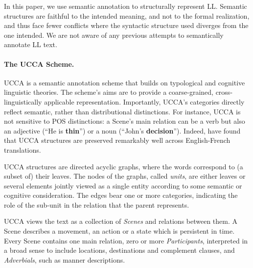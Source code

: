 \documentclass[a4paper, 11pt]{article}
\newcommand{\com}[1]{}
\begin{document}
In this paper, we use semantic annotation to structurally
represent LL. Semantic structures are faithful to the intended
meaning, and not to the formal realization, and thus face
fewer conflicts where the syntactic structure used diverges from
the one intended. We are not aware of any previous attempts to semantically
annotate LL text.


\paragraph{The UCCA Scheme.}\label{sec:ucca}
UCCA is a semantic annotation scheme that builds on
typological and cognitive linguistic theories.
The scheme's aims are to provide a coarse-grained, cross-linguistically
applicable representation.
Importantly, UCCA's categories directly reflect semantic, rather than
distributional distinctions.
For instance, UCCA is not sensitive to POS distinctions:
a Scene's main relation can be a verb but also an adjective
(``He is {\bf thin}'') or a noun (``John's {\bf decision}'').
Indeed,  have found that UCCA structures are
preserved remarkably well across English-French translations. 

UCCA structures are directed acyclic graphs, where the words
correspond to (a subset of) their leaves.
The nodes of the graphs, called {\it units}, are either leaves or several elements jointly
viewed as a single entity according to some semantic or cognitive consideration.
The edges bear one or more categories, indicating the role of 
the sub-unit in the relation that the parent represents.

UCCA views the text as a collection of {\it Scenes} and relations between them.
A Scene describes a movement, 
an action or a state which is persistent in time.
Every Scene contains one main relation, 
zero or more {\it Participants}, 
interpreted in a broad sense to include locations, destinations and complement clauses,
and {\it Adverbials}, such as manner descriptions.

\com{
\begin{figure}[t]
				\begin{tikzpicture}[sibling distance=10mm, level distance=10mm, ->,
				every node/.append style={midway},
				every circle node/.append style={fill=black}]
				{
					\node (Source) [circle] {}
					child {node (He) {He} edge from parent node[left] {\scriptsize A}
					}
					child {node (gave) {gve} edge from parent node[right] {\scriptsize A}}
					child {node (an apple) [circle] {}
						{
							child {node (an) {an} edge from parent node[left] {\scriptsize E}}
							child {node (apple){apple} edge from parent node[right] {\scriptsize C}}
						} edge from parent node[right] {\scriptsize P} }
					;}
					\end{tikzpicture}

		\end{figure}}
		
\end{document}
